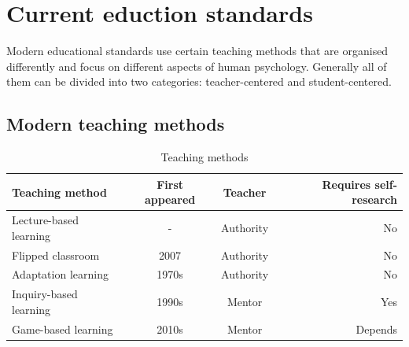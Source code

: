 \documentclass[10pt,oneside,english,a4paper]{article}
\begin{document}
\section{Current eduction standards} \label{back}
Modern educational standards use certain teaching methods that are organised differently and focus on different aspects of human psychology.  Generally all of them can be divided into two categories: teacher-centered and student-centered.
\subsection{Modern teaching methods}
\begin{table}[h!]
  \begin{center}
    \caption{Teaching methods}
    \label{tab:table1}
    \begin{tabular}{l|c|c|r} 
      \textbf{Teaching method} & \textbf{First appeared} & \textbf{Teacher}& \textbf{Requires self-research}\\
      \hline
      Lecture-based learning & - & Authority & No\\
      Flipped classroom & 2007 & Authority & No\\
      Adaptation learning & 1970s & Authority & No\\
      Inquiry-based learning & 1990s & Mentor & Yes\\
      Game-based learning & 2010s & Mentor & Depends\\
    \end{tabular}
  \end{center}
\end{table}
\end{document}
